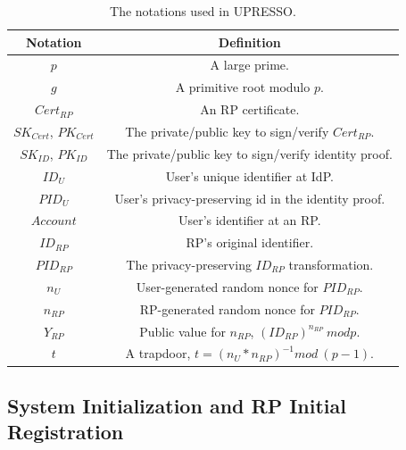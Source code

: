 \begin{table}[tb]
    \caption{The notations used in UPRESSO.}
    \centering
    \begin{tabular}{|c|c|}
    \hline
    {Notation} & {Definition} \\
    \hline
    {$p$} & {A large prime.} \\
    \hline
    {$g$} & {A primitive root  modulo $p$.} \\
    \hline
    {$Cert_{RP}$} & {An RP certificate.} \\
    \hline
    {$SK_{Cert}$, $PK_{Cert}$} & {The private/public key to sign/verify $Cert_{RP}$.} \\
    \hline
    {$SK_{ID}$, $PK_{ID}$} & {The private/public key to sign/verify identity proof.} \\
    \hline
    {$ID_U$} & {User's unique identifier at IdP.} \\
    \hline
    {$PID_U$} & {User's privacy-preserving id in the identity proof.} \\
    \hline
    {$Account$} & {User's identifier at an RP.} \\
    \hline
    {$ID_{RP}$} & {RP's original identifier.} \\
    \hline
    {$PID_{RP}$} & {The privacy-preserving $ID_{RP}$ transformation.} \\
    \hline
    {$n_U$} & {User-generated random nonce for $PID_{RP}$. } \\
    \hline
    {$n_{RP}$} & {RP-generated random nonce for $PID_{RP}$. } \\
    \hline
    {$Y_{RP}$} & {Public value for $n_{RP}$, $(ID_{RP})^{n_{RP}} \ mod p$. } \\
    \hline
    {$t$} & {A trapdoor, $t=(n_U*n_{RP})^{-1} mod \ (p-1)$. } \\
    \hline
    \end{tabular}
    \label{tbl:notations}
\end{table}

\subsection{System Initialization and RP Initial Registration}


